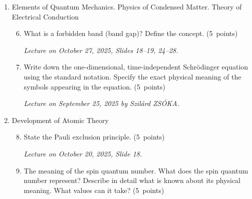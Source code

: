 \documentclass[a4paper,12pt]{letter}
\begin{document}
\begin{enumerate}[label=\Roman*.]
\begin{enumerate}[label=\arabic*.]
\smallskip
\textit{Lecture on October 6, 2025, Slides 29--31.}

\item What is meant by the dual nature of electromagnetic radiation? Describe the meaning of this expression. \hfill (5~points)

\smallskip
\textit{Lecture on October 20, 2025, Slides 23--30.}
  
\end{enumerate}
  

\item Elements of Quantum Mechanics. Physics of Condensed Matter. Theory of Electrical Conduction

\begin{enumerate}[label=\arabic*.]
\setcounter{enumii}{5} %
  
\item What is a forbidden band (band gap)? Define the concept. \hfill (5~points)

\smallskip
\textit{Lecture on October 27, 2025, Slides 18--19, 24--28.}

\item Write down the one-dimensional, time-independent Schrödinger equation using the standard notation. Specify the exact physical meaning of the symbols appearing in the equation. \hfill (5~points)

\smallskip
\textit{Lecture on September 25, 2025 by Szilárd ZSÓKA.}


\end{enumerate}

  
\item Development of Atomic Theory

\begin{enumerate}[label=\arabic*.]
\setcounter{enumii}{7} %

\item State the Pauli exclusion principle. \hfill (5~points)

\smallskip
\textit{Lecture on October 20, 2025, Slide 18.}

\item The meaning of the spin quantum number. What does the spin quantum number represent? Describe in detail what is known about its physical meaning. What values can it take? \hfill (5~points)


\end{enumerate}
\end{enumerate}
\end{document}
